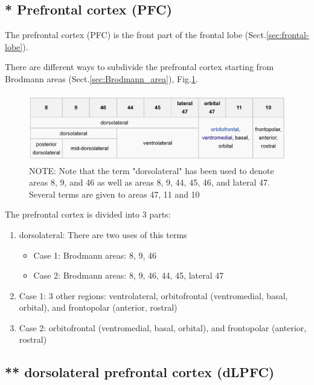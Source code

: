 \subsection{* Prefrontal cortex (PFC)}
\label{sec:prefrontal-cortex}

The prefrontal cortex (PFC) is the front part of the frontal lobe
(Sect.\ref{sec:frontal-lobe}). 

There are different ways to subdivide the prefrontal cortex starting from
Brodmann areas (Sect.\ref{sec:Brodmann_area}), Fig.\ref{fig:Brodmann_area-PFC}. 
 
\begin{figure}[hbt]
  \centerline{
  \includegraphics[height=3cm,
    angle=0]{./images/Brodmann_area-PFC.eps}}
\caption{NOTE: Note that the term "dorsolateral" has been used to denote areas
8, 9, and 46 as well as areas 8, 9, 44, 45, 46, and lateral 47. Several terms
are given to areas 47, 11 and 10}
\label{fig:Brodmann_area-PFC}
\end{figure}
 
 
The prefrontal cortex is divided into 3 parts:
\begin{enumerate}
  \item dorsolateral: There are two uses of this terms
  \begin{itemize}
    \item Case 1: Brodmann areas: 8, 9, 46
    \item Case 2: Brodmann areas: 8, 9, 46, 44, 45, lateral 47
  \end{itemize}
  
  \item Case 1: 3 other regions: ventrolateral, orbitofrontal (ventromedial,
  basal, orbital), and frontopolar (anterior, rostral)
  
  \item Case 2: orbitofrontal (ventromedial,  basal, orbital),
  and frontopolar (anterior, rostral)
\end{enumerate}

\subsection{** dorsolateral prefrontal cortex (dLPFC)}
\label{sec:dLPFC}

